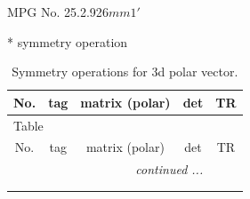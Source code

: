 \documentclass[fleqn,8pt]{jsarticle}
\begin{document}
\setcounter{MaxMatrixCols}{32}

\renewcommand{\tablename}{Table~}
\renewcommand{\figurename}{Figure~}
\begin{center}
\LARGE
MPG No. 25.2.92\quad$6mm1'$
\end{center}
* symmetry operation
\renewcommand{\arraystretch}{1.3}
\begin{longtable}{ccccc}
\caption{Symmetry operations for 3d polar vector.}
 \\
 \hline \hline
No. & tag & matrix (polar) & det & TR \\ \hline \endfirsthead

\multicolumn{4}{l}{\tablename\ \thetable{}} \\
 \hline \hline
No. & tag & matrix (polar) & det & TR \\ \hline \endhead

 \hline \hline
\multicolumn{4}{r}{\footnotesize\it continued ...} \\ \endfoot

 \hline \hline
\multicolumn{4}{r}{} \\ \endlastfoot


\end{longtable}
\end{document}
